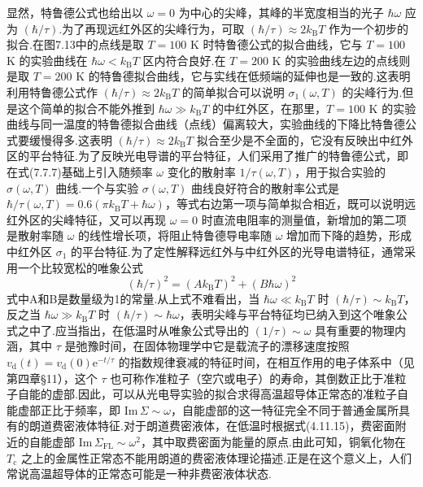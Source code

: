 显然，特鲁德公式也给出以 $\omega=0$ 为中心的尖峰，其峰的半宽度相当的光子 $\hbar\omega$ 应为 $\left(\hbar/\tau\right)$.为了再现远红外区的尖峰行为，可取 $\left(\hbar/\tau\right)\approx2k_{\mathrm{B}}T$ 作为一个初步的拟合.在图7.13中的点线是取 $T=100$ K 时特鲁德公式的拟合曲线，它与 $T=100$ K 的实验曲线在 $\hbar\omega<k_{\mathrm{B}}T$ 区内符合良好.在 $T=200$ K 的实验曲线左边的点线则是取 $T=200$ K 的特鲁德拟合曲线，它与实线在低频端的延伸也是一致的.这表明利用特鲁德公式作 $\left(\hbar/\tau\right)\approx2k_{\mathrm{B}}T$ 的简单拟合可以说明 $\sigma_{1}\left(\omega,T\right)$ 的尖峰行为.但是这个简单的拟合不能外推到 $\hbar\omega\gg k_{\mathrm{B}}T$ 的中红外区，在那里，$T=100$ K 的实验曲线与同一温度的特鲁德拟合曲线（点线）偏离较大，实验曲线的下降比特鲁德公式要缓慢得多.这表明 $\left(\hbar/\tau\right)\approx2k_{\mathrm{B}}T$ 拟合至少是不全面的，它没有反映出中红外区的平台特征.为了反映光电导谱的平台特征，人们采用了推广的特鲁德公式，即在式(7.7.7)基础上引入随频率 $\omega$ 变化的散射率 $1/\tau\left(\omega,T\right)$，用于拟合实验的 $\sigma\left(\omega,T\right)$ 曲线.一个与实验 $\sigma\left(\omega,T\right)$ 曲线良好符合的散射率公式是 $\hbar/\tau\left(\omega,T\right)=0.6\left(\pi k_{\mathrm{B}}T+\hbar\omega\right)$，等式右边第一项与简单拟合相近，既可以说明远红外区的尖峰特征，又可以再现 $\omega=0$ 时直流电阻率的测量值，新增加的第二项是散射率随 $\omega$ 的线性增长项，将阻止特鲁德导电率随 $\omega$ 增加而下降的趋势，形成中红外区 $\sigma_{1}$ 的平台特征.为了定性解释远红外与中红外区的光导电谱特征，通常采用一个比较宽松的唯象公式
\begin{equation}
  \left(\hbar/\tau\right)^{2}=\left(Ak_{\mathrm{B}}T\right)^{2}+\left(B\hbar\omega\right)^{2}
\end{equation}
式中A和B是数量级为1的常量.从上式不难看出，当 $\hbar\omega\ll k_{\mathrm{B}}T$ 时 $\left(\hbar/\tau\right)\sim k_{\mathrm{B}}T$，反之当 $\hbar\omega\gg k_{\mathrm{B}}T$ 时 $\left(\hbar/\tau\right)\sim\hbar\omega$，表明尖峰与平台特征均已纳入到这个唯象公式之中了.应当指出，在低温时从唯象公式导出的 $\left(1/\tau\right)\sim\omega$ 具有重要的物理内涵，其中 $\tau$ 是弛豫时间，在固体物理学中它是载流子的漂移速度按照 $v_{\mathrm{d}}(t)=v_{\mathrm{d}}(0)\mathrm{e}^{-t/\tau}$ 的指数规律衰减的特征时间，在相互作用的电子体系中（见第四章§11），这个 $\tau$ 也可称作准粒子（空穴或电子）的寿命，其倒数正比于准粒子自能的虚部.因此，可以从光电导实验的拟合求得高温超导体正常态的准粒子自能虚部正比于频率，即 $\mathrm{Im}\,\Sigma\sim\omega$，自能虚部的这一特征完全不同于普通金属所具有的朗道费密液体特征.对于朗道费密液体，在低温时根据式(4.11.15)，费密面附近的自能虚部 $\mathrm{Im}\,\Sigma_{\mathrm{FL}}\sim\omega^{2}$，其中取费密面为能量的原点.由此可知，铜氧化物在 $T_{\mathrm{c}}$ 之上的金属性正常态不能用朗道的费密液体理论描述.正是在这个意义上，人们常说高温超导体的正常态可能是一种非费密液体状态.

